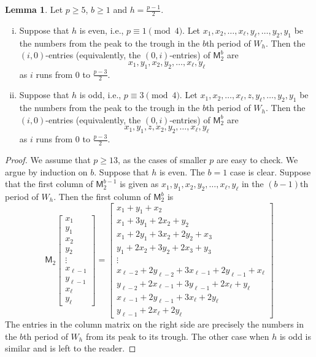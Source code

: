 \documentclass[12pt,reqno]{amsart}
\renewcommand{\geq}{\geqslant}
\newcommand{\M}{\mathsf{M}}
\theoremstyle{definition}
\newtheorem{lem}[thm]{Lemma}
\numberwithin{equation}{section}
\begin{document}
\begin{lem}\label{L:m2lemma} Let $p\geq 5$, $b\geq 1$ and $h=\frac{p-1}{2}$.
\begin{enumerate}[(i)]
	\item Suppose that $h$ is even, i.e., $p\equiv 1\pmod 4$. Let $x_1,x_2,\ldots,x_\ell,y_\ell,\ldots,y_2,y_1$ be the numbers from the peak to the trough in the $b$th period of $W_h$. Then the $(i,0)$-entries (equivalently, the $(0,i)$-entries) of $\M_2^b$ are \[x_1,y_1,x_2,y_2,\ldots,x_\ell,y_\ell\] as $i$ runs from $0$ to $\frac{p-3}{2}$.
	
    \item Suppose that $h$ is odd, i.e., $p\equiv 3\pmod 4$. Let $x_1,x_2,\ldots,x_\ell,z,y_\ell,\ldots,y_2,y_1$ be the numbers from the peak to the trough in the $b$th period of $W_h$. Then the $(i,0)$-entries (equivalently, the $(0,i)$-entries) of $\M_2^b$ are \[x_1,y_1,z,x_2,y_2,\ldots,x_\ell,y_\ell\] as $i$ runs from $0$ to $\frac{p-3}{2}$.
\end{enumerate}
\end{lem}
\begin{proof}
    We assume that $p \geq 13$, as the cases of smaller $p$ are easy to check. We argue by induction on $b$. Suppose that $h$ is even. The $b=1$ case is clear. Suppose that the first column of $\M_2^{b-1}$ is given as $x_1,y_1,x_2,y_2,\ldots,x_\ell,y_\ell$ in the $(b-1)$th period of $W_h$. Then the first column of $\M_2^b$ is \[\M_2\begin{bmatrix} x_1\\ y_1\\ x_2\\ y_2\\ \vdots\\ x_{\ell-1}\\ y_{\ell-1}\\ x_\ell\\ y_\ell
    \end{bmatrix}=\begin{bmatrix} x_1+y_1+x_2\\ x_1+3y_1+2x_2+y_2\\ x_1+2y_1+3x_2+2y_2+x_3\\ y_1+2x_2+3y_2+2x_3+y_3\\ \vdots\\ x_{\ell-2}+2y_{\ell-2}+3x_{\ell-1}+2y_{\ell-1}+x_\ell\\ y_{\ell-2}+2x_{\ell-1}+3y_{\ell-1}+2x_\ell+y_\ell\\ x_{\ell-1}+2y_{\ell-1}+3x_\ell+2y_\ell\\
		y_{\ell-1}+2x_\ell+2y_\ell
	\end{bmatrix}\] The entries in the column matrix on the 
right side are precisely the numbers in the $b$th period of $W_h$ from its peak to its trough. The other case when $h$ is odd is similar and is left to the reader.  
\end{proof}
\end{document}
